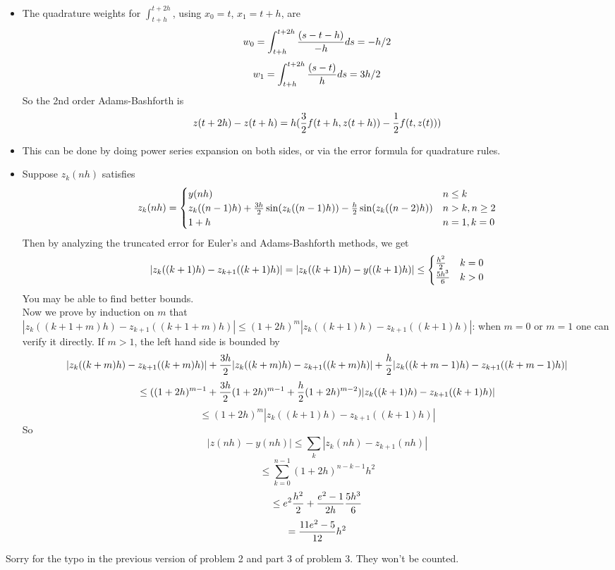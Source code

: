 \documentclass[20pt]{article} %
\theoremstyle{break}
\begin{document}
\begin{itemize}
\item The quadrature weights for $\int_{t+h}^{t+2h}$, using $x_0=t$, $x_1=t+h$, are
  \[w_0=\int_{t+h}^{t+2h}{(s-t-h)\over -h}ds=-h/2\]
  \[w_1=\int_{t+h}^{t+2h}{(s-t)\over h}ds=3h/2\]
  So the 2nd order Adams-Bashforth is
  \[z(t+2h)-z(t+h)=h({3\over 2}f(t+h, z(t+h))-{1\over 2}f(t, z(t)))\]
\item This can be done by doing power series expansion on both sides, or via the error formula for quadrature rules.
\item Suppose $z_k(nh)$ satisfies
  \[z_k(nh)=\begin{cases}y(nh) & n\leq k\\ z_k((n-1)h)+{3h\over 2}\sin(z_k((n-1)h))-{h\over 2}\sin(z_k((n-2)h)) & n>k, n\geq 2\\ 1+h & n=1, k=0 \end{cases}\]
  Then by analyzing the truncated error for Euler's and Adams-Bashforth methods, we get
  \[|z_k((k+1)h)-z_{k+1}((k+1)h)|=|z_k((k+1)h)-y((k+1)h)|\leq \begin{cases}{h^2\over 2} & k=0 \\ {5h^3\over 6} & k>0\end{cases}\]
  You may be able to find better bounds.\\

  Now we prove by induction on $m$ that $|z_k((k+1+m)h)-z_{k+1}((k+1+m)h)|\leq (1+2h)^m|z_k((k+1)h)-z_{k+1}((k+1)h)|$: when $m=0$ or $m=1$ one can verify it directly. If $m>1$, the left hand side is bounded by
  \[|z_k((k+m)h)-z_{k+1}((k+m)h)|+{3h\over 2}|z_k((k+m)h)-z_{k+1}((k+m)h)|+{h\over 2}|z_k((k+m-1)h)-z_{k+1}((k+m-1)h)|\]
  \[\leq ((1+2h)^{m-1}+{3h\over 2}(1+2h)^{m-1}+{h\over 2}(1+2h)^{m-2})|z_k((k+1)h)-z_{k+1}((k+1)h)|\]
  \[\leq (1+2h)^m|z_k((k+1)h)-z_{k+1}((k+1)h)|\]
  So
  \[|z(nh)-y(nh)|\leq \sum_k|z_k(nh)-z_{k+1}(nh)|\]
  \[\leq\sum_{k=0}^{n-1}(1+2h)^{n-k-1}h^2\]
  \[\leq e^2{h^2\over 2}+{e^2-1\over 2h}{5h^3\over 6}\]
  \[={11e^2-5\over 12}h^2\]
\end{itemize}

Sorry for the typo in the previous version of problem 2 and part 3 of problem 3. They won't be counted.
\end{document}
